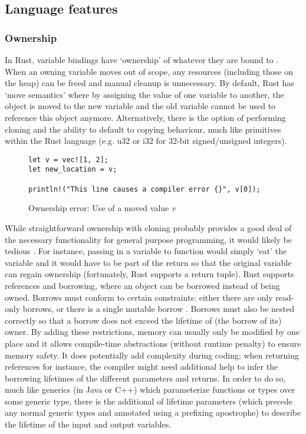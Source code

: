 \subsection{Language features}

\subsubsection{Ownership}

In Rust, variable bindings have `ownership' of whatever they are bound to \cite{docowner15}\cite{rustbook15}. When an owning variable moves out of scope, any resources (including those on the heap) can be freed and manual cleanup is unnecessary. By default, Rust has `move semantics' where by assigning the value of one variable to another, the object is moved to the new variable and the old variable cannot be used to reference this object anymore. Alternatively, there is the option of performing cloning and the ability to default to copying behaviour, much like primitives within the Rust language (e.g. u32 or i32 for 32-bit signed/unsigned integers).

\begin{figure}[H]
\centering
\begin{verbatim}
let v = vec![1, 2];
let new_location = v;

println!("This line causes a compiler error {}", v[0]);
\end{verbatim}
\caption{Ownership error: Use of a moved value \emph{v}}
\end{figure}

While straightforward ownership with cloning probably provides a good deal of the necessary functionality for general purpose programming, it would likely be tedious \cite{docowner15}. For instance, passing in a variable to function would simply `eat' the variable and it would have to be part of the return so that the original variable can regain ownership (fortunately, Rust supports a return tuple). Rust supports references and borrowing, where an object can be borrowed instead of being owned. Borrows must conform to certain constraints: either there are only read-only borrows, or there is a single mutable borrow \cite{docborrow15}. Borrows must also be nested correctly so that a borrow does not exceed the lifetime of (the borrow of its) owner. By adding these restrictions, memory can usually only be modified by one place and it allows compile-time abstractions (without runtime penalty) to ensure memory safety. It does potentially add complexity during coding; when returning references for instance, the compiler might need additional help to infer the borrowing lifetimes of the different parameters and returns. In order to do so, much like generics (in Java or C++) which parameterize functions or types over some generic type, there is the additional of lifetime parameters (which precede any normal generic types and annotated using a prefixing apostrophe) to describe the lifetime of the input and output variables.


